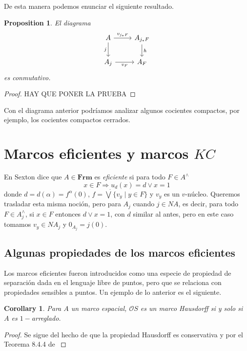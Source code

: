 \documentclass[11pt]{amsart}
\theoremstyle{plain}
\newtheorem{cor}[thm]{Corollary}
\newtheorem{prop}[thm]{Proposition}
\theoremstyle{definition}
\begin{document}
De esta manera podemos enunciar el siguiente resultado.

\begin{prop}\label{VFsquare}
El diagrama
\[\begin{tikzcd}
	A & {A_{j_*F}} \\
	{A_j} & {A_F}
	\arrow["{v_{j_*F}}", from=1-1, to=1-2]
	\arrow["j"', from=1-1, to=2-1]
	\arrow["h", from=1-2, to=2-2]
	\arrow["{v_F}"', from=2-1, to=2-2]
\end{tikzcd}\]
es conmutativo.
\end{prop}

\begin{proof}
HAY QUE PONER LA PRUEBA
\end{proof}

Con el diagrama anterior podríamos analizar algunos cocientes compactos, por ejemplo, los cocientes compactos cerrados.


\section{Marcos eficientes y marcos $KC$}

En \cite{sexton2006point} Sexton dice que $A\in \mathbf{Frm}$ es \emph{eficiente} si para todo $F\in A^\wedge$
\[
x\in F\Rightarrow u_d(x)=d\vee x=1
\]
donde $d=d(\alpha)=f^\alpha(0)$, $f=\dot{\bigvee}\{v_y\mid y\in F\}$ y $v_y$ es un $v$-núcleo. Queremos trasladar esta misma noción, pero para $A_j$ cuando $j\in NA$, es decir, para todo $F\in A_j^\wedge$, si $x\in F$ entonces $d\vee x=1$, con $d$ similar al antes, pero en este caso tomamos $v_y\in NA_j$ y $0_{A_j}=j(0)$.\\

\subsection{Algunas propiedades de los marcos eficientes}
Los marcos eficientes fueron introducidos como una especie de propiedad de separación dada en el lenguaje 
libre de puntos, pero que se relaciona con propiedades sensibles a puntos. Un ejemplo de lo anterior es el
siguiente.

\begin{cor}
    Para $A$ un marco espacial, $\mathcal{O}S$ es un marco Hausdorff si y solo si $A$ es $1-$arreglado.
\end{cor}

\begin{proof}
    Se sigue del hecho de que la propiedad Hausdorff es conservativa y por el Teorema 8.4.4 de \cite{sexton2006point}
\end{proof}
\end{document}
